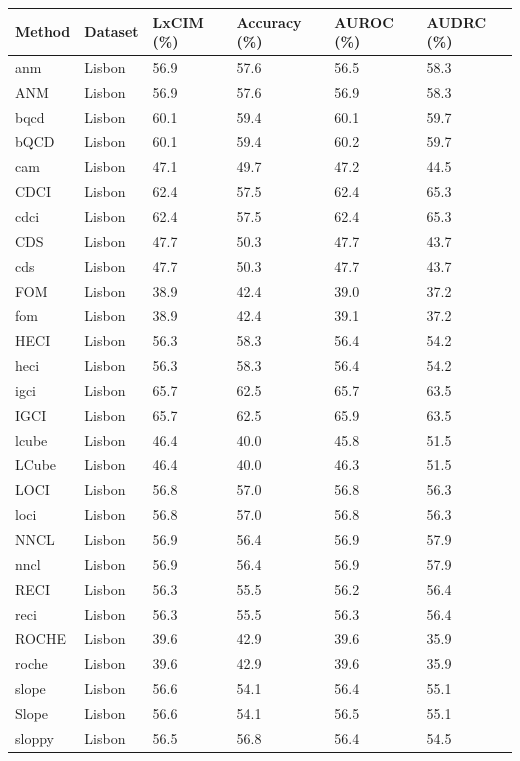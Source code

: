 \begin{tabular}{llllll}
\toprule
Method & Dataset & LxCIM (\%) & Accuracy (\%) & AUROC (\%) & AUDRC (\%) \\
\midrule
anm & Lisbon & 56.9 & 57.6 & 56.5 & 58.3 \\
ANM & Lisbon & 56.9 & 57.6 & 56.9 & 58.3 \\
bqcd & Lisbon & 60.1 & 59.4 & 60.1 & 59.7 \\
bQCD & Lisbon & 60.1 & 59.4 & 60.2 & 59.7 \\
cam & Lisbon & 47.1 & 49.7 & 47.2 & 44.5 \\
CDCI & Lisbon & 62.4 & 57.5 & 62.4 & 65.3 \\
cdci & Lisbon & 62.4 & 57.5 & 62.4 & 65.3 \\
CDS & Lisbon & 47.7 & 50.3 & 47.7 & 43.7 \\
cds & Lisbon & 47.7 & 50.3 & 47.7 & 43.7 \\
FOM & Lisbon & 38.9 & 42.4 & 39.0 & 37.2 \\
fom & Lisbon & 38.9 & 42.4 & 39.1 & 37.2 \\
HECI & Lisbon & 56.3 & 58.3 & 56.4 & 54.2 \\
heci & Lisbon & 56.3 & 58.3 & 56.4 & 54.2 \\
igci & Lisbon & 65.7 & 62.5 & 65.7 & 63.5 \\
IGCI & Lisbon & 65.7 & 62.5 & 65.9 & 63.5 \\
lcube & Lisbon & 46.4 & 40.0 & 45.8 & 51.5 \\
LCube & Lisbon & 46.4 & 40.0 & 46.3 & 51.5 \\
LOCI & Lisbon & 56.8 & 57.0 & 56.8 & 56.3 \\
loci & Lisbon & 56.8 & 57.0 & 56.8 & 56.3 \\
NNCL & Lisbon & 56.9 & 56.4 & 56.9 & 57.9 \\
nncl & Lisbon & 56.9 & 56.4 & 56.9 & 57.9 \\
RECI & Lisbon & 56.3 & 55.5 & 56.2 & 56.4 \\
reci & Lisbon & 56.3 & 55.5 & 56.3 & 56.4 \\
ROCHE & Lisbon & 39.6 & 42.9 & 39.6 & 35.9 \\
roche & Lisbon & 39.6 & 42.9 & 39.6 & 35.9 \\
slope & Lisbon & 56.6 & 54.1 & 56.4 & 55.1 \\
Slope & Lisbon & 56.6 & 54.1 & 56.5 & 55.1 \\
sloppy & Lisbon & 56.5 & 56.8 & 56.4 & 54.5 \\
\bottomrule
\end{tabular}
